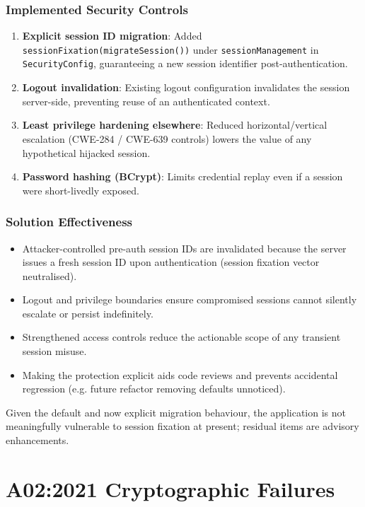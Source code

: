 \documentclass[]{UCD_CS_FYP_Report}
\begin{document}
\subsection*{Implemented Security Controls}
\begin{enumerate}
	\item \textbf{Explicit session ID migration}: Added \texttt{sessionFixation(migrateSession())} under \texttt{sessionManagement} in \texttt{SecurityConfig}, guaranteeing a new session identifier post-authentication.
	\item \textbf{Logout invalidation}: Existing logout configuration invalidates the session server-side, preventing reuse of an authenticated context.
	\item \textbf{Least privilege hardening elsewhere}: Reduced horizontal/vertical escalation (CWE-284 / CWE-639 controls) lowers the value of any hypothetical hijacked session.
	\item \textbf{Password hashing (BCrypt)}: Limits credential replay even if a session were short-livedly exposed.
\end{enumerate}

\subsection*{Solution Effectiveness}
\begin{itemize}
	\item Attacker-controlled pre-auth session IDs are invalidated because the server issues a fresh session ID upon authentication (session fixation vector neutralised).
	\item Logout and privilege boundaries ensure compromised sessions cannot silently escalate or persist indefinitely.
	\item Strengthened access controls reduce the actionable scope of any transient session misuse.
	\item Making the protection explicit aids code reviews and prevents accidental regression (e.g. future refactor removing defaults unnoticed).
\end{itemize}

Given the default and now explicit migration behaviour, the application is not meaningfully vulnerable to session fixation at present; residual items are advisory enhancements.


\chapter{A02:2021 Cryptographic Failures}
\end{document}

